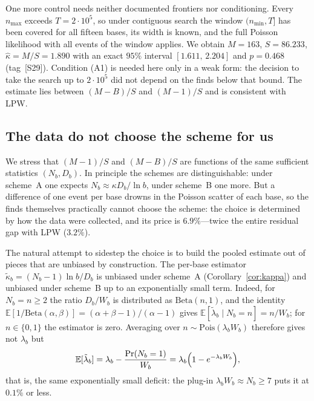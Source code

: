 \documentclass[11pt,a4paper]{article}
\theoremstyle{plain}
\theoremstyle{remark}
\begin{document}
One more control needs neither documented frontiers nor conditioning. Every
$n_{\max}$ exceeds $T=2\cdot10^5$, so under contiguous search the window
$(n_{\min},T]$ has been covered for all fifteen bases, its width is known, and the
full Poisson likelihood with all events of the window applies. We obtain
$M=163$, $S=86.233$, $\hat\kappa=M/S=1.890$ with an exact $95\%$ interval
$[1.611,\,2.204]$ and $p=0.468$ (tag~[S29]). Condition (A1) is needed here only
in a weak form: the decision to take the search up to $2\cdot10^5$ did not depend
on the finds below that bound. The estimate lies between $(M-B)/S$ and $(M-1)/S$
and is consistent with LPW.

\subsection{The data do not choose the scheme for us}\label{sec:noescape}

We stress that $(M-1)/S$ and $(M-B)/S$ are functions of the same sufficient
statistics $(N_b,D_b)$. In principle the schemes are distinguishable: under
scheme~A one expects $N_b\approx\kappa D_b/\ln b$, under scheme~B one more. But a
difference of one event per base drowns in the Poisson scatter of each base, so
the finds themselves practically cannot choose the scheme: the choice is
determined by how the data were collected, and its price is $6.9\%$---twice the
entire residual gap with LPW ($3.2\%$).

The natural attempt to sidestep the choice is to build the pooled estimate out
of pieces that are unbiased by construction. The per-base estimator
$\tilde\kappa_b=(N_b-1)\ln b/D_b$ is unbiased under scheme~A
(Corollary~\ref{cor:kappa}) and unbiased under scheme~B up to an exponentially
small term. Indeed, for $N_b=n\ge2$ the ratio $D_b/W_b$ is distributed as
$\mathrm{Beta}(n,1)$, and the identity
$\mathbb E[1/\mathrm{Beta}(\alpha,\beta)]=(\alpha+\beta-1)/(\alpha-1)$ gives
$\mathbb E[\tilde\lambda_b\mid N_b=n]=n/W_b$; for $n\in\{0,1\}$ the estimator is
zero. Averaging over $n\sim\mathrm{Pois}(\lambda_bW_b)$ therefore gives not
$\lambda_b$ but
\[
  \mathbb E[\tilde\lambda_b]=\lambda_b-\frac{\Pr(N_b=1)}{W_b}
  =\lambda_b\Bigl(1-e^{-\lambda_bW_b}\Bigr),
\]
that is, the same exponentially small deficit: the plug-in
$\lambda_bW_b\approx N_b\ge7$ puts it at $0.1\%$ or less.
\end{document}
